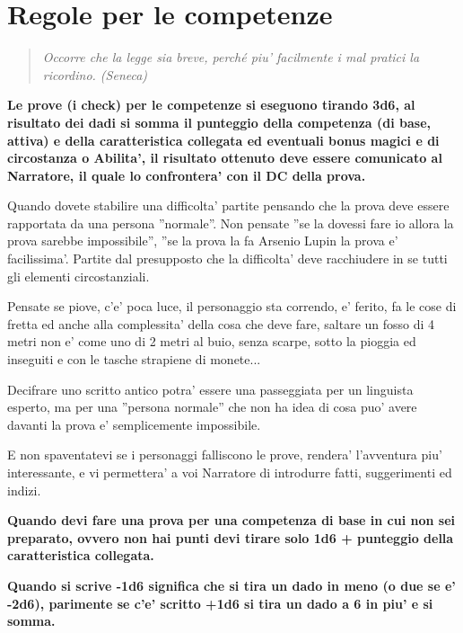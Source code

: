 \documentclass[a4paper,11pt,twoside,openany]{book}
\begin{document}
\pagebreak

\section{Regole per le competenze}

\label{regole-per-le-competenze}
\begin{quote}\textit{
Occorre che la legge sia breve, perché piu' facilmente i mal pratici la ricordino. (Seneca)
}\end{quote}

\textbf{Le prove (i check) per le competenze si eseguono tirando 3d6, al risultato dei dadi si somma il punteggio della competenza (di base, attiva) e della caratteristica collegata ed eventuali bonus magici e di circostanza o Abilita', il risultato ottenuto deve essere comunicato al Narratore, il quale lo confrontera' con il DC della prova.}

Quando dovete stabilire una difficolta' partite pensando che la prova deve essere rapportata da una persona ''normale''. Non pensate ''se la dovessi fare io allora la prova sarebbe impossibile'', ''se la prova la fa Arsenio Lupin la prova e' facilissima'. Partite dal presupposto che la difficolta' deve racchiudere in se tutti gli elementi circostanziali.

Pensate se piove, c'e' poca luce, il personaggio sta correndo, e' ferito, fa le cose di fretta ed anche alla complessita' della cosa che deve fare, saltare un fosso di 4 metri non e' come uno di 2 metri al buio, senza scarpe, sotto la pioggia ed inseguiti e con le tasche strapiene di monete...

Decifrare uno scritto antico potra' essere una passeggiata per un linguista esperto, ma per una ''persona normale'' che non ha idea di cosa puo' avere davanti la prova e' semplicemente impossibile.

E non spaventatevi se i personaggi falliscono le prove, rendera' l'avventura piu' interessante, e vi permettera' a voi Narratore di introdurre fatti, suggerimenti ed indizi.

\bigskip

\textbf{Quando devi fare una prova per una competenza di base in cui
non sei preparato, ovvero non hai punti devi tirare solo 1d6 + punteggio
della caratteristica collegata.}

\textbf{Quando si scrive -1d6 significa che si tira un dado in meno
(o due se e' -2d6), parimente se c'e' scritto +1d6 si tira un dado
a 6 in piu' e si somma.}
\end{document}
